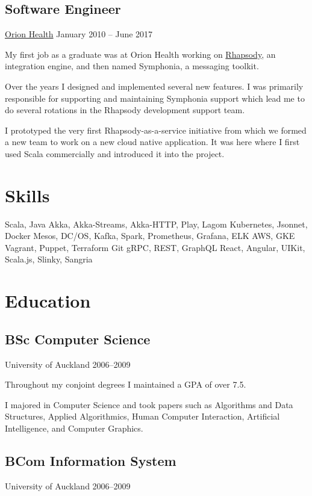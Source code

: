 \documentclass[11pt]{article}
\begin{document}
    \subsection{Software Engineer}
    \label{subsec:software-engineer}
    \href{https://orionhealth.com/nz/}{Orion Health}
    January 2010 -- June 2017

    My first job as a graduate was at Orion Health working on
    \href{https://www.lyniate.com/rhapsody/}{Rhapsody}, an integration engine, and then named
    Symphonia, a messaging toolkit.

    Over the years I designed and implemented several new features.
    I was primarily responsible for supporting and maintaining Symphonia support which lead me to
    do several rotations in the Rhapsody development support team.

    I prototyped the very first Rhapsody-as-a-service initiative from which we formed a new team
    to work on a new cloud native application.
    It was here where I first used Scala commercially and introduced it into the project.


    \section{Skills}
    \label{sec:skills}
    Scala, Java
    Akka, Akka-Streams, Akka-HTTP, Play, Lagom
    Kubernetes, Jsonnet, Docker
    Mesos, DC/OS, Kafka, Spark, Prometheus, Grafana, ELK
    AWS, GKE
    Vagrant, Puppet, Terraform
    Git
    gRPC, REST, GraphQL
    React, Angular, UIKit, Scala.js, Slinky, Sangria


    \section{Education}
    \label{sec:education}

    \subsection{BSc Computer Science}
    \label{subsec:bsc-computer-science}
    University of Auckland
    2006--2009

    Throughout my conjoint degrees I maintained a GPA of over 7.5.

    I majored in Computer Science and took papers such as Algorithms and Data Structures, Applied
    Algorithmics, Human Computer Interaction, Artificial Intelligence, and Computer Graphics.

    \subsection{BCom Information System}
    \label{subsec:bcom-information-system}
    University of Auckland
    2006--2009
\end{document}
